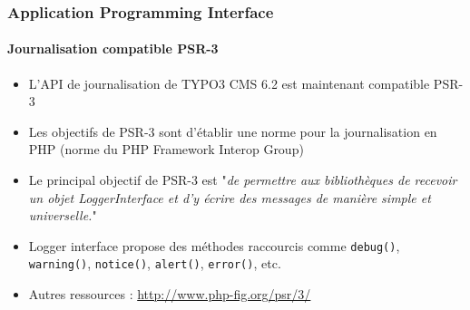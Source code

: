 \begin{frame}[fragile]
	\frametitle{Application Programming Interface}
	\framesubtitle{Journalisation compatible PSR-3}

	\begin{itemize}
		\item L'API de journalisation de TYPO3 CMS 6.2 est maintenant compatible PSR-3
		\item Les objectifs de PSR-3 sont d'établir une norme pour la journalisation en PHP (norme du PHP Framework Interop Group)

		\item Le principal objectif de PSR-3 est
			"\emph{de permettre aux bibliothèques de recevoir un objet LoggerInterface et d'y écrire des messages de manière simple et universelle.}"

		\item Logger interface propose des méthodes raccourcis comme\newline
			\texttt{debug()}, \texttt{warning()}, \texttt{notice()}, \texttt{alert()}, \texttt{error()}, etc.

		\item Autres ressources :\newline
			\url{http://www.php-fig.org/psr/3/}

	\end{itemize}

\end{frame}


